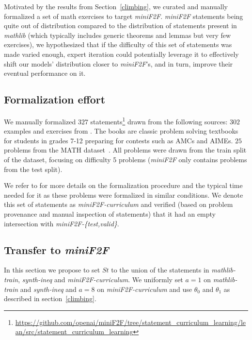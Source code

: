 \documentclass[nohyperref]{article}
\theoremstyle{plain}
\theoremstyle{definition}
\theoremstyle{remark}
\begin{document}
Motivated by the results from Section~\ref{climbing}, we curated and manually formalized a set of math exercises to target \textit{miniF2F}. \textit{miniF2F} statements being quite out of distribution compared to the distribution of statements present in \textit{mathlib} (which typically includes generic theorems and lemmas but very few exercises), we hypothesized that if the difficulty of this set of statements was made varied enough, expert iteration could potentially leverage it to effectively shift our models' distribution closer to \textit{miniF2F}'s, and in turn, improve their eventual performance on it.

\subsection{Formalization effort}

We manually formalized $327$ statements\footnote{\url{https://github.com/openai/miniF2F/tree/statement_curriculum_learning/lean/src/statement_curriculum_learning}} drawn from the following sources: $302$ examples and exercises from \citet{aopsv1,aopsv2}. The books are classic problem solving textbooks for students in grades 7-12 preparing for contests such as AMCs and AIMEs. $25$ problems from the MATH dataset~\cite{hendrycks2021measuring}. All problems were drawn from the train split of the dataset, focusing on difficulty 5 problems (\textit{miniF2F} only contains problems from the test split).

We refer to \citet{zheng2021minif2f} for more details on the formalization procedure and the typical time needed for it as these problems were formalized in similar conditions. We denote this set of statements as \textit{miniF2F-curriculum} and verified (based on problem provenance and manual inspection of statements) that it had an empty intersection with \textit{miniF2F-\{test,valid\}}.

\subsection{Transfer to \textit{miniF2F}}

In this section we propose to set $\mathit{St}$ to the union of the statements in \textit{mathlib-train}, \textit{synth-ineq} and \textit{miniF2F-curriculum}. We uniformly set $a=1$ on \textit{mathlib-train} and \textit{synth-ineq} and $a=8$ on \textit{miniF2F-curriculum} and use $\theta_0$ and $\theta_1$ as described in section~\ref{climbing}.
\end{document}
